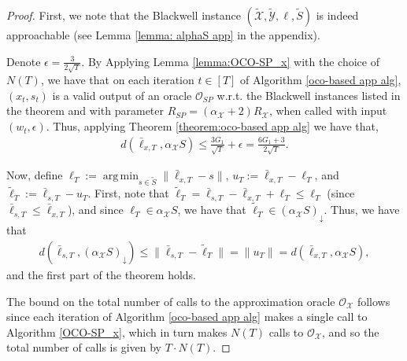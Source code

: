 \documentclass[a4paper,12pt]{article}
\DeclareMathOperator*{\argmin}{arg\,min}
\newcommand{\mX}{\mathcal{X}}
\newcommand{\tY}{\tilde{\mathcal{Y}}}
\newcommand{\tX}{\tilde{\mathcal{X}}}
\newcommand{\tS}{\tilde{S}}
\newcommand{\oraclesp}{\mathcal{O}_{SP}}
\newcommand{\oraclex}{\mathcal{O}_{\mX}}
\begin{document}
\begin{proof}
First, we note that the Blackwell instance $(\tX, \tY, \ell, \tS)$ is indeed approachable (see Lemma \ref{lemma: alphaS app} in the appendix).

Denote $\epsilon =\frac{3}{2\sqrt{T}}$. By Applying Lemma \ref{lemma:OCO-SP_x} with the choice of $N(T)$, we have that on each iteration $t\in[T]$ of Algorithm \ref{oco-based app  alg}, $(x_t,s_t)$ is a valid output of an oracle $\oraclesp$ w.r.t. the Blackwell instances listed in the theorem and with parameter $R_{SP} = (\alpha_{\mX}+2)R_{\mX}$, when called with input $(w_t, \epsilon)$. Thus, applying Theorem \ref{theorem:oco-based app  alg} we have that,
\begin{align*}%
d\left(\bar{\ell}_{x,T} , \alpha_{\mX} S\right) \leq \frac{3G_1}{\sqrt{T}} + \epsilon = \frac{6G_1+3}{2\sqrt{T}}.
\end{align*} 

Now, define $\ell_{T} := \argmin_{s \in \tS} \|\bar{\ell}_{x,T} - s\|$, $u_{T}:=\bar{\ell}_{x,T} - \ell_{T}$, and $\tilde{\ell}_{T}:=\bar{\ell}_{s,T} - u_{T}$. First, note that $\tilde{\ell}_T = \bar{\ell}_{s,T} - \bar{\ell}_{x,T} + \ell_T \leq \ell_T$ (since $\bar{\ell}_{s,T} \leq \bar{\ell}_{x,T}$), and since $\ell_T\in\alpha_{\mX}S$, we have that $\tilde{\ell}_T\in(\alpha_{\mX}S)_{\downarrow}$. Thus, we have that
\begin{align*}
d\left(\bar{\ell}_{s,T} ,{\left( \alpha_{\mX} S\right)}_\downarrow \right) \leq \|\bar{\ell}_{s,T}-\tilde{\ell}_{T}\| =\|u_{T}\| = d\left(\bar{\ell}_{x,T} , \alpha_{\mX} S\right),
\end{align*}
and the first part of the theorem holds.

The bound on the total number of calls to the approximation oracle $\oraclex$ follows since each iteration of Algorithm \ref{oco-based app  alg} makes a single call to  Algorithm \ref{OCO-SP_x}, which in turn makes $N(T)$ calls to $\oraclex$, and so the total number of calls is given by $T\cdot{}N(T)$.
\end{proof}
\end{document}
